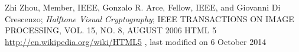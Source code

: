 \begin{thebibliography}{99}
 Zhi Zhou, Member, IEEE, Gonzalo R. Arce, Fellow, IEEE, and Giovanni Di Crescenzo; \emph{Halftone Visual Cryptography}; IEEE TRANSACTIONS ON IMAGE PROCESSING, VOL. 15, NO. 8, AUGUST 2006
 HTML 5 \url{http://en.wikipedia.org/wiki/HTML5} , last modified on 6 October 2014
\end{thebibliography}